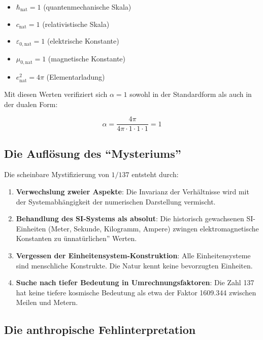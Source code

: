 \begin{itemize}
	\item $\hbar_{\text{nat}} = 1$ (quantenmechanische Skala)
	\item $c_{\text{nat}} = 1$ (relativistische Skala)
	\item $\varepsilon_{0,\text{nat}} = 1$ (elektrische Konstante)
	\item $\mu_{0,\text{nat}} = 1$ (magnetische Konstante)
	\item $e_{\text{nat}}^2 = 4\pi$ (Elementarladung)
\end{itemize}

Mit diesen Werten verifiziert sich $\alpha = 1$ sowohl in der Standardform als auch in der dualen Form:

\begin{equation}
	\alpha = \frac{4\pi}{4\pi \cdot 1 \cdot 1 \cdot 1} = 1
\end{equation}

\subsection{Die Auflösung des ``Mysteriums''}
\label{subsec:mystery_resolution}

Die scheinbare Mystifizierung von $1/137$ entsteht durch:

\begin{enumerate}
	\item \textbf{Verwechslung zweier Aspekte}: Die Invarianz der Verhältnisse wird mit der Systemabhängigkeit der numerischen Darstellung vermischt.
	
	\item \textbf{Behandlung des SI-Systems als absolut}: Die historisch gewachsenen SI-Einheiten (Meter, Sekunde, Kilogramm, Ampere) zwingen elektromagnetische Konstanten zu ünnatürlichen'' Werten.
	
	\item \textbf{Vergessen der Einheitensystem-Konstruktion}: Alle Einheitensysteme sind menschliche Konstrukte. Die Natur kennt keine bevorzugten Einheiten.
	
	\item \textbf{Suche nach tiefer Bedeutung in Umrechnungsfaktoren}: Die Zahl 137 hat keine tiefere kosmische Bedeutung als etwa der Faktor 1609.344 zwischen Meilen und Metern.
\end{enumerate}

\subsection{Die anthropische Fehlinterpretation}
\label{subsec:anthropic_fallacy}

